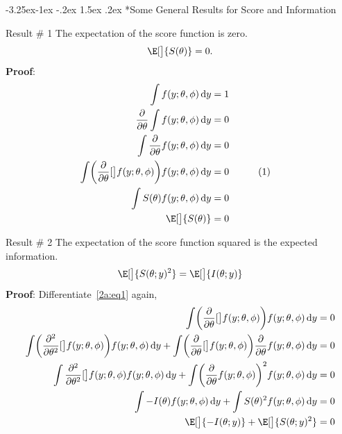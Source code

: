 \documentclass[final]{article}\usepackage[]{graphicx}\usepackage[svgnames]{xcolor}
\makeatletter
\renewcommand\subsection{\@startsection{subsection}{2}{\z@}%
                                     {-3.25ex\@plus -1ex \@minus -.2ex}%
                                     {1.5ex \@plus .2ex}%
                                     {\normalfont\large\bfseries\scshape\color{Blue}}}
\let\log\relax%
\makeatother
\begin{document}
\subsection*{Some General Results for Score and Information}
\begin{Result}{Result \# 1}
    The expectation of the score function is zero.
    \[ \E[\big]{S(\theta)}=0. \]
    \tcblower{}
    \textbf{Proof}:
    \begin{align*}
        \int f(y;\theta,\phi)\odif{y}                                                         & =1                               \\
        \pdv*{\int f(y;\theta,\phi)\odif{y}}{\theta}                                          & =0                               \\
        \int\pdv*{f(y;\theta,\phi)}{\theta} \odif{y}                                          & =0                               \\
        \int\biggl(\pdv*{\log[\big]{f(y;\theta,\phi)}}{\theta}\biggr)f(y;\theta,\phi)\odif{y} & =0 &  & \label{2a:eq1}\tag*{(1)} \\
        \int S(\theta)f(y;\theta,\phi)\odif{y}                                                & =0                               \\
        \E[\big]{S(\theta)}                                                                   & =0
    \end{align*}
\end{Result}
\begin{Result}{Result \# 2}
    The expectation of the score function squared is the expected information.
    \[  \E[\big]{S(\theta;y)^2}=\E[\big]{I(\theta;y)} \]
    \tcblower{}
    \textbf{Proof}: Differentiate~\ref{2a:eq1} again,
    \begin{align*}
        \int\biggl(\pdv*{\log[\big]{f(y;\theta,\phi)}}{\theta}\biggr)f(y;\theta,\phi)\odif{y}                                                                                                                & =0 \\
        \int \biggl(\pdv*[order=2]{\log[\big]{f(y;\theta,\phi)}}{\theta}\biggr)f(y;\theta,\phi)\odif{y}+\int\biggl(\pdv*{\log[\big]{f(y;\theta,\phi)}}{\theta}\biggr)\pdv*{f(y;\theta,\phi)}{\theta}\odif{y} & =0 \\
        \int \pdv*[order=2]{\log[\big]{f(y;\theta,\phi)}}{\theta}f(y;\theta,\phi)\odif{y}+\int\biggl(\pdv*{f(y;\theta,\phi)}{\theta}\biggr)^2 f(y;\theta,\phi)\odif{y}                                       & =0 \\
        \int -I(\theta)f(y;\theta,\phi)\odif{y}+\int S(\theta)^2 f(y;\theta,\phi)\odif{y}                                                                                                                    & =0 \\
        \E[\big]{-I(\theta;y)}+\E[\big]{S(\theta;y)^2}                                                                                                                                                       & =0
    \end{align*}
\end{Result}
\end{document}
